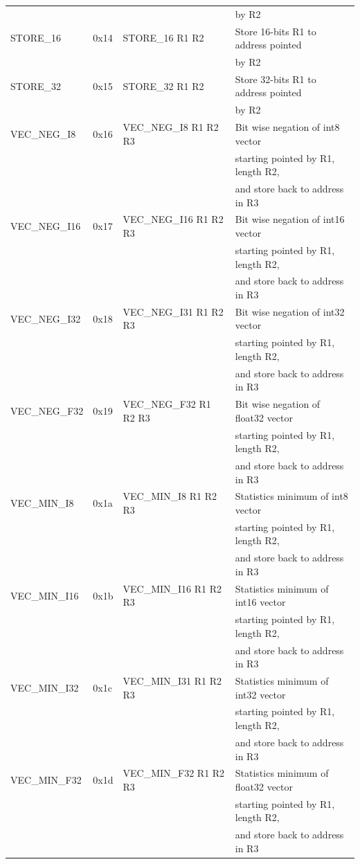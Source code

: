 \begin{paper}
\begin{center}
\begin{longtable}{l l l l}
&&& by R2\\
STORE\_16 & 0x14 & STORE\_16 R1 R2 & Store 16-bits R1 to address pointed\\
&&& by R2\\
STORE\_32 & 0x15 & STORE\_32 R1 R2 & Store 32-bits R1 to address pointed\\
&&& by R2\\
VEC\_NEG\_I8 & 0x16 & VEC\_NEG\_I8 R1 R2 R3 & Bit wise negation of int8 vector\\
&&& starting pointed by R1, length R2,\\
&&& and store back to address in R3\\
VEC\_NEG\_I16 & 0x17 & VEC\_NEG\_I16 R1 R2 R3 & Bit wise negation of int16 vector\\
&&& starting pointed by R1, length R2,\\
&&& and store back to address in R3\\
VEC\_NEG\_I32 & 0x18 & VEC\_NEG\_I31 R1 R2 R3 & Bit wise negation of int32 vector\\
&&& starting pointed by R1, length R2,\\
&&& and store back to address in R3\\
VEC\_NEG\_F32 & 0x19 & VEC\_NEG\_F32 R1 R2 R3 & Bit wise negation of float32 vector\\
&&& starting pointed by R1, length R2,\\
&&& and store back to address in R3\\
VEC\_MIN\_I8 & 0x1a & VEC\_MIN\_I8 R1 R2 R3 & Statistics minimum of int8 vector\\
&&& starting pointed by R1, length R2,\\
&&& and store back to address in R3\\
VEC\_MIN\_I16 & 0x1b & VEC\_MIN\_I16 R1 R2 R3 & Statistics minimum of int16 vector\\
&&& starting pointed by R1, length R2,\\
&&& and store back to address in R3\\
VEC\_MIN\_I32 & 0x1c & VEC\_MIN\_I31 R1 R2 R3 & Statistics minimum of int32 vector\\
&&& starting pointed by R1, length R2,\\
&&& and store back to address in R3\\
VEC\_MIN\_F32 & 0x1d & VEC\_MIN\_F32 R1 R2 R3 & Statistics minimum of float32 vector\\
&&& starting pointed by R1, length R2,\\
&&& and store back to address in R3\\
\end{longtable}
\end{center}



\end{paper}
